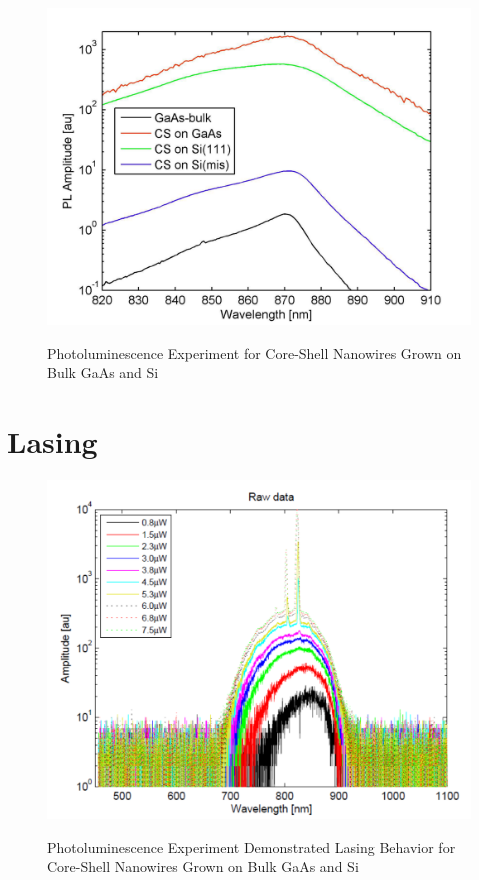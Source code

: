 \begin{figure}
  \caption{Photoluminescence Experiment for Core-Shell Nanowires Grown on Bulk GaAs and Si}
  \centering
  \includegraphics[width=\textwidth]{pictures/Data/PL}
  \label{PL}
\end{figure}

\section{Lasing} \label{BH_data}

\begin{figure}
  \caption{Photoluminescence Experiment Demonstrated Lasing Behavior for Core-Shell Nanowires Grown on Bulk GaAs and Si}
  \centering
  \includegraphics[width=\textwidth]{pictures/Data/lasing}
  \label{lasing}
\end{figure}
